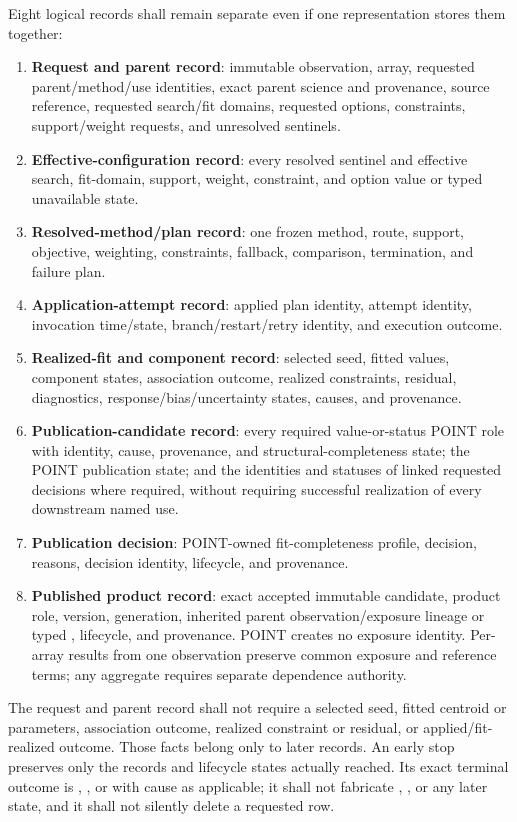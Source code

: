 Eight logical records shall remain separate even if one representation stores
them together:
\begin{enumerate}[label=\Alph*.]
\item \textbf{Request and parent record}: immutable observation, array,
requested parent/method/use identities, exact parent science and provenance,
source reference, requested search/fit domains, requested options, constraints,
support/weight requests, and unresolved sentinels.
\item \textbf{Effective-configuration record}: every resolved sentinel and
effective search, fit-domain, support, weight, constraint, and option value or
typed unavailable state.
\item \textbf{Resolved-method/plan record}: one frozen method, route, support,
objective, weighting, constraints, fallback, comparison, termination, and
failure plan.
\item \textbf{Application-attempt record}: applied plan identity, attempt
identity, invocation time/state, branch/restart/retry identity, and execution
outcome.
\item \textbf{Realized-fit and component record}: selected seed, fitted
values, component states, association outcome, realized constraints, residual,
diagnostics, response/bias/uncertainty states, causes, and provenance.
\item \textbf{Publication-candidate record}: every required value-or-status
POINT role with identity, cause, provenance, and structural-completeness state;
the POINT publication state; and the identities and statuses of linked
requested decisions where required, without requiring successful realization
of every downstream named use.
\item \textbf{Publication decision}: POINT-owned fit-completeness profile,
decision, reasons, decision identity, lifecycle, and provenance.
\item \textbf{Published product record}: exact accepted immutable candidate,
product role, version, generation, inherited parent observation/exposure
lineage or typed , lifecycle, and provenance. POINT creates
no exposure identity. Per-array results from one observation preserve common
exposure and reference terms; any aggregate requires separate dependence
authority.
\end{enumerate}

The request and parent record shall not require a selected seed, fitted
centroid or parameters, association outcome, realized constraint or residual,
or applied/fit-realized outcome. Those facts belong only to later records.
An early stop preserves only the records and lifecycle states actually
reached. Its exact terminal outcome is , , or
 with cause as applicable; it shall not fabricate
, , or any later state, and it shall not
silently delete a requested row.

